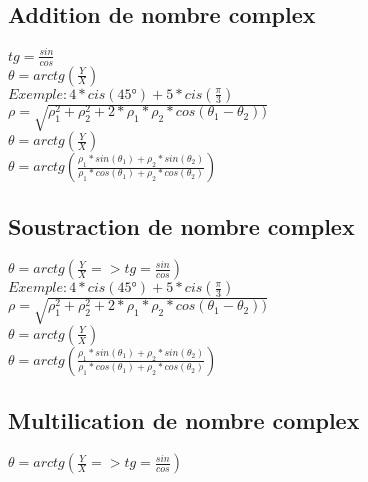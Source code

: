 \vspace{4mm} %
\subsection{Addition de nombre complex}

$tg = \frac{sin}{cos}$ \\
$\theta = arctg(\frac{Y}{X})$ \\

$ Exemple : 4*cis(45°) + 5*cis(\frac{\pi}{3})$\\

$\rho = \sqrt{\rho_1^{2}+\rho_2^{2} + 2 * \rho_1 * \rho_2 * cos(\theta_1-\theta_2))}$ \\

$\theta = arctg(\frac{Y}{X})$\\

$\theta = arctg(\frac{\rho_1 * sin(\theta_1) + \rho_2 * sin(\theta_2)} {\rho_1 * cos(\theta_1) + \rho_2 * cos(\theta_2)})$ \\

\vspace{4mm} %
\subsection{Soustraction de nombre complex}

$\theta = arctg(\frac{Y}{X} => tg = \frac{sin}{cos} )$ \\

$ Exemple : 4*cis(45°) + 5*cis(\frac{\pi}{3})$\\

$\rho = \sqrt{\rho_1^{2}+\rho_2^{2} + 2 * \rho_1 * \rho_2 * cos(\theta_1-\theta_2))}$ \\

$\theta = arctg(\frac{Y}{X})$\\

$\theta = arctg(\frac{\rho_1 * sin(\theta_1) + \rho_2 * sin(\theta_2)} {\rho_1 * cos(\theta_1) + \rho_2 * cos(\theta_2)})$ \\

\vspace{4mm} %
\subsection{Multilication de nombre complex}

$\theta = arctg(\frac{Y}{X} => tg = \frac{sin}{cos} )$ \\

